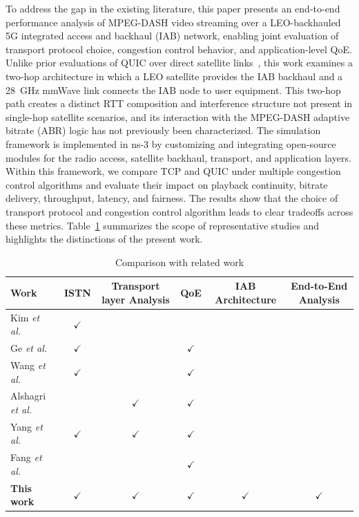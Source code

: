 \documentclass[journal]{IEEEtran}
\begin{document}
To address the gap in the existing literature, this paper presents an end-to-end performance analysis of MPEG-DASH video streaming over a LEO-backhauled 5G integrated access and backhaul (IAB) network, enabling joint evaluation of transport protocol choice, congestion control behavior, and application-level QoE. Unlike prior evaluations of QUIC over direct satellite links~\cite{Alshagri2023,Yang2018,Lai2025}, this work examines a two-hop architecture in which a LEO satellite provides the IAB backhaul and a 28~GHz mmWave link connects the IAB node to user equipment. This two-hop path creates a distinct RTT composition and interference structure not present in single-hop satellite scenarios, and its interaction with the MPEG-DASH adaptive bitrate (ABR) logic has not previously been characterized. The simulation framework is implemented in ns-3 by customizing and integrating open-source modules for the radio access, satellite backhaul, transport, and application layers. Within this framework, we compare TCP and QUIC under multiple congestion control algorithms and evaluate their impact on playback continuity, bitrate delivery, throughput, latency, and fairness. The results show that the choice of transport protocol and congestion control algorithm leads to clear tradeoffs across these metrics. Table~\ref{tab:related_work_comparison} summarizes the scope of representative studies and highlights the distinctions of the present work.

\begin{table}[t]
\centering
\caption{Comparison with related work}
\label{tab:related_work_comparison}
\renewcommand{\arraystretch}{1.15}
\setlength{\tabcolsep}{6pt}
\begin{tabular}{lccccc}
\toprule
\textbf{Work} & \textbf{ISTN} & \textbf{Transport layer Analysis} & \textbf{QoE} & \textbf{IAB Architecture} & \textbf{End-to-End Analysis} \\
\midrule
Kim \textit{et al.}~\cite{Kim2019} & $\checkmark$ &  &  &  &  \\
Ge \textit{et al.}~\cite{Ge2019} & $\checkmark$ &  & $\checkmark$ &  &  \\
Wang \textit{et al.}~\cite{Wang2018} & $\checkmark$ &  & $\checkmark$ &  &  \\
Alshagri \textit{et al.}~\cite{Alshagri2023} &  & $\checkmark$ & $\checkmark$ &  &  \\
Yang \textit{et al.}~\cite{Yang2018} & $\checkmark$ & $\checkmark$ & $\checkmark$ &  &  \\
Fang \textit{et al.}~\cite{Fang2024} &  &  & $\checkmark$ &  &  \\
\textbf{This work} & $\checkmark$ & $\checkmark$ & $\checkmark$ & $\checkmark$ & $\checkmark$ \\
\bottomrule
\end{tabular}
\end{table}
\end{document}
